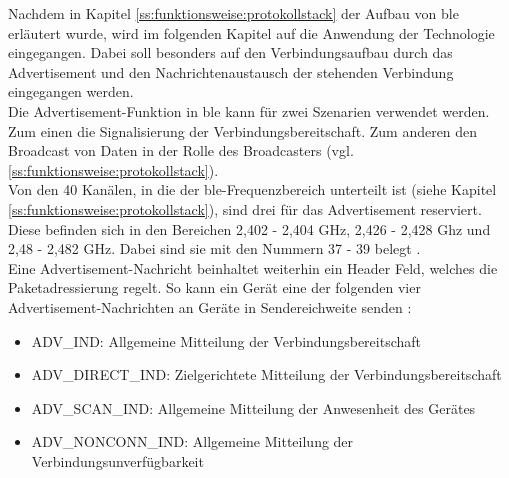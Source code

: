 \noindent Nachdem in Kapitel \ref{ss:funktionsweise:protokollstack} der Aufbau von \ac{ble} erläutert wurde, wird im folgenden Kapitel auf die Anwendung der Technologie eingegangen. Dabei soll besonders auf den Verbindungsaufbau durch das Advertisement und den Nachrichtenaustausch der stehenden Verbindung eingegangen werden.\\
\noindent Die Advertisement-Funktion in \ac{ble} kann für zwei Szenarien verwendet werden. Zum einen die Signalisierung der Verbindungsbereitschaft. Zum anderen den Broadcast von Daten in der Rolle des Broadcasters (vgl. \ref{ss:funktionsweise:protokollstack}).\\
\noindent Von den 40 Kanälen, in die der \ac{ble}-Frequenzbereich unterteilt ist (siehe Kapitel \ref{ss:funktionsweise:protokollstack}), sind drei für das Advertisement reserviert. Diese befinden sich in den Bereichen 2,402 - 2,404 GHz, 2,426 - 2,428 Ghz und 2,48 - 2,482 GHz. Dabei sind sie mit den Nummern 37 - 39 belegt \cite[Seite 16]{Townsend14:GSB}.\\
\noindent Eine Advertisement-Nachricht beinhaltet weiterhin ein Header Feld, welches die Paketadressierung regelt. So kann ein Gerät eine der folgenden vier Advertisement-Nachrichten an Geräte in Sendereichweite senden \cite[Seite 22]{Townsend14:GSB}:
\begin{itemize}
	\setlength{\itemsep}{1pt}
	\item{ADV\_IND: Allgemeine Mitteilung der Verbindungsbereitschaft}
	\item{ADV\_DIRECT\_IND: Zielgerichtete Mitteilung der Verbindungsbereitschaft}
	\item{ADV\_SCAN\_IND: Allgemeine Mitteilung der Anwesenheit des Gerätes}
	\item{ADV\_NONCONN\_IND: Allgemeine Mitteilung der Verbindungsunverfügbarkeit}
\end{itemize} 

